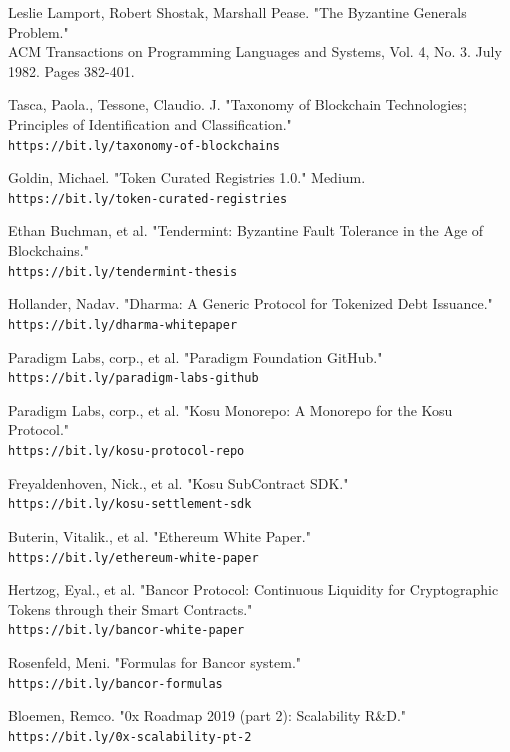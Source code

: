 \documentclass[10pt]{article}
\begin{document}
\begin{thebibliography}{9}
Leslie Lamport, Robert Shostak, Marshall Pease. "The Byzantine Generals Problem."
\\ACM Transactions on Programming Languages and Systems, Vol. 4, No. 3. July 1982. Pages 382-401.

Tasca, Paola., Tessone, Claudio. J. "Taxonomy of Blockchain Technologies; Principles of Identification and Classification."
\\\texttt{https://bit.ly/taxonomy-of-blockchains}

Goldin, Michael. "Token Curated Registries 1.0." Medium.
\\\texttt{https://bit.ly/token-curated-registries}

Ethan Buchman, et al. "Tendermint: Byzantine Fault Tolerance in the Age of Blockchains."
\\\texttt{https://bit.ly/tendermint-thesis}

Hollander, Nadav. "Dharma: A Generic Protocol for Tokenized Debt Issuance."
\\\texttt{https://bit.ly/dharma-whitepaper}

Paradigm Labs, corp., et al. "Paradigm Foundation GitHub."
\\\texttt{https://bit.ly/paradigm-labs-github}

Paradigm Labs, corp., et al. "Kosu Monorepo: A Monorepo for the Kosu Protocol."
\\\texttt{https://bit.ly/kosu-protocol-repo}

Freyaldenhoven, Nick., et al. "Kosu SubContract SDK."
\\\texttt{https://bit.ly/kosu-settlement-sdk}

Buterin, Vitalik., et al. "Ethereum White Paper."
\\\texttt{https://bit.ly/ethereum-white-paper}

Hertzog,  Eyal., et al. "Bancor Protocol: Continuous Liquidity for Cryptographic Tokens through their Smart Contracts."
\\\texttt{https://bit.ly/bancor-white-paper}

Rosenfeld, Meni. "Formulas for Bancor system."
\\\texttt{https://bit.ly/bancor-formulas}

Bloemen, Remco. "0x Roadmap 2019 (part 2): Scalability R\&D."
\\\texttt{https://bit.ly/0x-scalability-pt-2}


\end{thebibliography}
\end{document}
